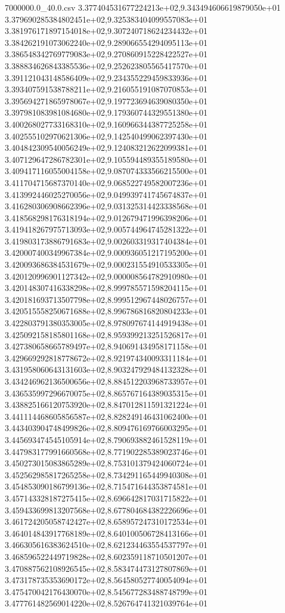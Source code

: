 \begin{filecontents*}{7000000.0_40.0.csv}
3.377404531677224213e+02,9.343494606619879050e+01
3.379690285384802451e+02,9.325383404099557083e+01
3.381976171897154018e+02,9.307240718624234432e+01
3.384262191073062240e+02,9.289066554294095113e+01
3.386548342769779083e+02,9.270860915228422527e+01
3.388834626843385536e+02,9.252623805565417570e+01
3.391121043148586409e+02,9.234355229459833936e+01
3.393407591538788211e+02,9.216055191087070853e+01
3.395694271865978067e+02,9.197723694639080350e+01
3.397981083981084680e+02,9.179360744329551380e+01
3.400268027733168310e+02,9.160966344387725258e+01
3.402555102970621306e+02,9.142540499062397430e+01
3.404842309540056249e+02,9.124083212622099381e+01
3.407129647286782301e+02,9.105594489355189580e+01
3.409417116055004158e+02,9.087074333566215500e+01
3.411704715687370140e+02,9.068522749582007236e+01
3.413992446025270056e+02,9.049939741745674837e+01
3.416280306908662396e+02,9.031325314423338568e+01
3.418568298176318194e+02,9.012679471996398206e+01
3.419418267975713093e+02,9.005744964745281322e+01
3.419803173886791683e+02,9.002603319317404384e+01
3.420007400349967384e+02,9.000936051217195200e+01
3.420093686384531679e+02,9.000231554910533305e+01
3.420120996901127342e+02,9.000008564782910980e+01
3.420148307416338298e+02,8.999785571598204115e+01
3.420181693713507798e+02,8.999512967448026757e+01
3.420515558250671688e+02,8.996786816820804233e+01
3.422803791380353005e+02,8.978097674144919438e+01
3.425092158185801168e+02,8.959399213251526817e+01
3.427380658665789497e+02,8.940691434958171158e+01
3.429669292818778672e+02,8.921974340093311184e+01
3.431958060643131603e+02,8.903247929484132328e+01
3.434246962136500656e+02,8.884512203968733957e+01
3.436535997296670075e+02,8.865767164389035315e+01
3.438825166120753920e+02,8.847012811591321224e+01
3.441114468605856587e+02,8.828249146431062400e+01
3.443403904748499826e+02,8.809476169766003295e+01
3.445693474545105914e+02,8.790693882461528119e+01
3.447983177991660568e+02,8.771902285389023746e+01
3.450273015083865289e+02,8.753101379424060724e+01
3.452562985817265258e+02,8.734291165449940308e+01
3.454853090186799136e+02,8.715471644353874581e+01
3.457143328187275415e+02,8.696642817031715822e+01
3.459433699813207568e+02,8.677804684382226696e+01
3.461724205058742427e+02,8.658957247310172534e+01
3.464014843917768189e+02,8.640100506728413166e+01
3.466305616383624510e+02,8.621234463554537797e+01
3.468596522449719828e+02,8.602359118710501207e+01
3.470887562108926545e+02,8.583474473127807869e+01
3.473178735353690172e+02,8.564580527740054094e+01
3.475470042176430070e+02,8.545677283488748799e+01
3.477761482569014220e+02,8.526764741321039764e+01

\end{filecontents*}

